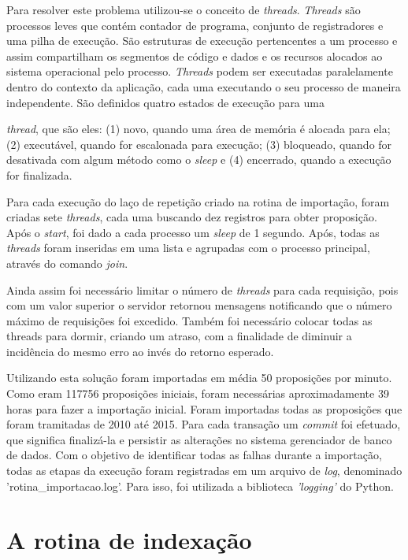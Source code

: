 \documentclass[
	12pt,				%
	openright,			%
	twoside,			%
	a4paper,			%
	english,			%
	french,				%
	spanish,			%
	brazil				%
	]{abntex2}
\begin{document}
Para resolver este problema utilizou-se o conceito de \emph{threads}. \emph{Threads} são processos leves que contém contador de programa, conjunto
de registradores e uma pilha de execução. São estruturas de execução pertencentes a um processo e assim compartilham os segmentos de
código e dados e os recursos alocados ao sistema operacional pelo processo. \emph{Threads} podem ser executadas paralelamente dentro do
contexto da aplicação, cada uma executando o seu processo de maneira independente. São definidos quatro estados de execução para 
uma {\emph{thread}, que são eles: (1) novo, quando uma área de memória é alocada para ela; (2) executável, quando for escalonada para
execução; (3) bloqueado, quando for desativada com algum método como o \emph{sleep} e (4) encerrado, quando a execução for finalizada.

Para cada execução do laço de repetição criado na rotina de importação, foram criadas sete \emph{threads}, cada uma buscando dez
registros para obter proposição. Após o \emph{start}, foi dado a cada processo um \emph{sleep} de 1 segundo. Após, todas as
\emph{threads} foram inseridas em uma lista e agrupadas com o processo principal, através do comando \emph{join}.

Ainda assim foi necessário limitar o número de \emph{threads} para cada requisição, pois com um valor superior o servidor 
retornou mensagens notificando que o número máximo de requisições foi excedido. Também foi necessário colocar todas as threads 
para dormir, criando um atraso, com a finalidade de diminuir a incidência do mesmo erro ao invés do retorno esperado. 

Utilizando esta solução foram importadas em média 50 proposições por minuto. Como eram 117756 proposições iniciais, foram necessárias 
aproximadamente 39 horas para fazer a importação inicial. Foram importadas todas as proposições que foram tramitadas de 2010 até 2015. Para 
cada transação um \emph{commit} foi efetuado, que significa finalizá-la e persistir as alterações no sistema gerenciador de banco de dados.
Com o objetivo de identificar todas as falhas durante a importação, todas as etapas da execução foram registradas em um arquivo de \emph{log}, denominado
'rotina\_importacao.log'. Para isso, foi utilizada a biblioteca \emph{'logging'} do Python.

\section{A rotina de indexação}


}
\end{document}
